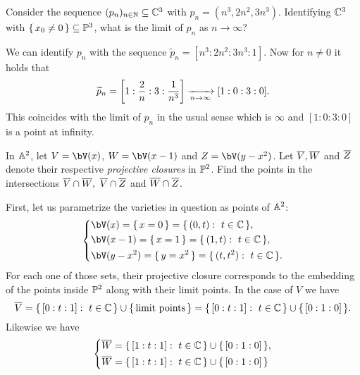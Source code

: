 \documentclass[12pt]{memoir}
\begin{document}
  \begin{Ej}
    Consider the sequence $(p_n)_{n\in\mathbb{N}}\subseteq\mathbb{C}^3$ with $p_n=(n^3,2n^2,3n^3)$. Identifying $\mathbb{C}^3$ with $\{\,x_0\neq 0\,\}\subseteq\mathbb{P}^3$, what is the limit of $p_n$ as $n\to\infty$?
   \end{Ej}

  \begin{ptcbr}
    We can identify $p_n$ with the sequence $\widetilde{p}_n=[n^3:2n^2:3n^3:1]$. Now for $n\neq 0$ it holds that 
    $$\widetilde{p}_n=\left\lbrack1:\frac2n:3:\frac{1}{n^3}\right\rbrack\xrightarrow[n\to\infty]{}[1:0:3:0].$$
    This coincides with the limit of $p_n$ in the usual sense which is $\infty$ and $[1:0:3:0]$ is a point at infinity.
  \end{ptcbr}

  \begin{Ej}
    In $\mathbb{A}^2$, let $V=\bV(x)$, $W=\bV(x-1)$ and $Z=\bV(y-x^2)$. Let $\overline V,\overline W$ and $\overline Z$ denote their respective \emph{projective closures} in $\mathbb{P}^2$. Find the points in the intersections $\overline V\cap \overline W,\ \overline V\cap \overline Z$ and $\overline W\cap \overline Z$.
  \end{Ej}

  \begin{ptcbr}
    First, let us parametrize the varieties in question as points of $\mathbb{A}^2$:
    $$
    \left\lbrace
    \begin{aligned}
      &\bV(x)=\set{x=0}=\set{(0,t):\ t\in\bC},\\
      &\bV(x-1)=\set{x=1}=\set{(1,t):\ t\in\bC},\\
      &\bV(y-x^2)=\set{y=x^2}=\set{(t,t^2):\ t\in\bC}.
    \end{aligned}
    \right.
    $$
    For each one of those sets, their projective closure corresponds to the embedding of the points inside $\mathbb{P}^2$ along with their limit points. In the case of $V$ we have 
    $$\ov V=\set{[0:t:1]:\ t\in\bC}\cup\set{\text{limit points}}=\set{[0:t:1]:\ t\in\bC}\cup\set{[0:1:0]}.$$
    Likewise we have 
    $$
    \left\lbrace
    \begin{aligned}
      &\overline W=\{\,[1:t:1]:\ t\in\mathbb{C}\,\}\cup\{\,[0:1:0]\,\},\\
      &\overline W=\{\,[1:t:1]:\ t\in\mathbb{C}\,\}\cup\{\,[0:1:0]\,\}
    \end{aligned}
    \right.
    $$
  \end{ptcbr}
\end{document}
